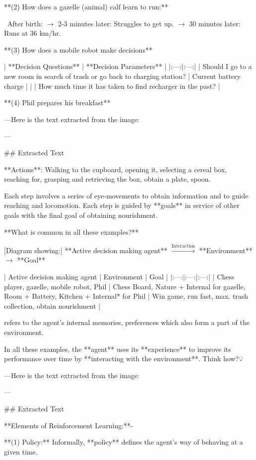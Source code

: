 **(2) How does a gazelle (animal) calf learn to run:**

 After birth:
$\to$ 2-3 minutes later: Struggles to get up.
$\to$ 30 minutes later: Runs at 36 km/hr.

**(3) How does a mobile robot make decisions**

| **Decision Questions** | **Decision Parameters** |
|:---:|:---:|
| Should I go to a new room in search of trash or go back to charging station? | Current battery charge |
| | How much time it has taken to find recharger in the past? |

**(4) Phil prepares his breakfast**

---Here is the text extracted from the image:

---

## Extracted Text


**Actions**: Walking to the cupboard, opening it, selecting a cereal box, reaching for, grasping and retrieving the box, obtain a plate, spoon.

Each step involves a series of eye-movements to obtain information and to guide reaching and locomotion. Each step is guided by **goals** in service of other goals with the final goal of obtaining nourishment.

**What is common in all these examples?**

[Diagram showing:] **Active decision making agent** $\xrightarrow{\text{Interaction}}$ **Environment** $\to$ **Goal**

| Active decision making agent | Environment | Goal |
|:---:|:---:|:---:|
| Chess player, gazelle, mobile robot, Phil | Chess Board, Nature + Internal for gazelle, Room + Battery, Kitchen + Internal* for Phil | Win game, run fast, max. trash collection, obtain nourishment |

\* refers to the agent's internal memories, preferences which also form a part of the environment.

In all these examples, the **agent** uses its **experience** to improve its performance over time by **interacting with the environment**. Think how?💡

---Here is the text extracted from the image:

---

## Extracted Text

**Elements of Reinforcement Learning:**-

**(1) Policy:** Informally, **policy** defines the agent's way of behaving at a given time.

